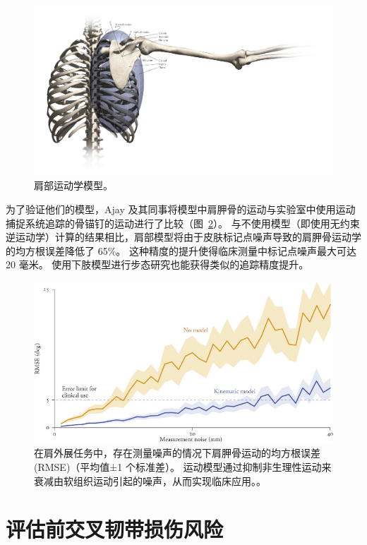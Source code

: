 \begin{figure}[!htb]
	\centering
	\includegraphics[width=0.95\linewidth]{chap7/7_15}
	\caption{肩部运动学模型\cite{seth2016biomechanical}。 \label{fig:7_15}}
\end{figure}

为了验证他们的模型，Ajay 及其同事将模型中肩胛骨的运动与实验室中使用运动捕捉系统追踪的骨锚钉的运动进行了比较（图~\ref{fig:7_16}）。
与不使用模型（即使用无约束逆运动学）计算的结果相比，肩部模型将由于皮肤标记点噪声导致的肩胛骨运动学的均方根误差降低了 65\%。
这种精度的提升使得临床测量中标记点噪声最大可达 20 毫米。
使用下肢模型进行步态研究也能获得类似的追踪精度提升。

\begin{figure}[!htb]
	\centering
	\includegraphics[width=1.0\linewidth]{chap7/7_16}
	\caption{在肩外展任务中，存在测量噪声的情况下肩胛骨运动的均方根误差 (RMSE)（平均值±1 个标准差）。
		运动模型通过抑制非生理性运动来衰减由软组织运动引起的噪声，从而实现临床应用。\cite{seth2016biomechanical}。 \label{fig:7_16}}
\end{figure}



\section{评估前交叉韧带损伤风险}

